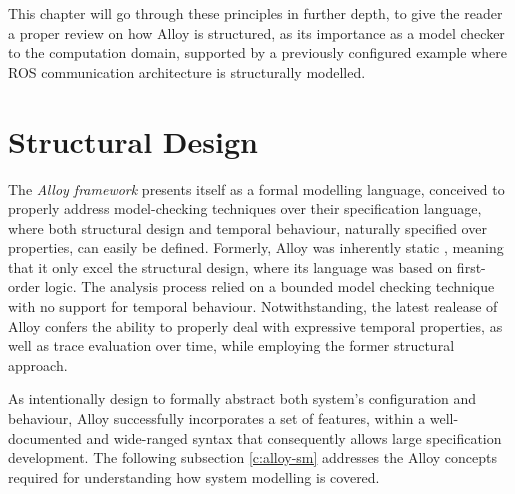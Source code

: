 This chapter will go through these principles in further depth, to give the reader a proper review on how Alloy is structured, as its importance as a model checker to the computation domain, supported by a previously configured example where ROS communication architecture is structurally modelled.

\section{Structural Design}

The \textit{Alloy framework} presents itself as a formal modelling language, conceived to properly address model-checking techniques over their specification language, where both structural design and temporal behaviour, naturally specified over properties, can easily be defined. Formerly, Alloy was inherently static \cite{lwspecification}, meaning that it only excel the structural design, where its language was based on first-order logic. The analysis process relied on a bounded model checking technique with no support for temporal behaviour. Notwithstanding, the latest realease of Alloy confers the ability to properly deal with expressive temporal properties, as well as trace evaluation over time, while employing the former structural approach. 

As intentionally design to formally abstract both system's configuration and behaviour, Alloy successfully incorporates a set of features, within a well-documented and wide-ranged syntax that consequently allows large specification development. \cite{carvalho2020analysis} The following subsection \ref{c:alloy-sm} addresses the Alloy concepts required for understanding how system modelling is covered. 


